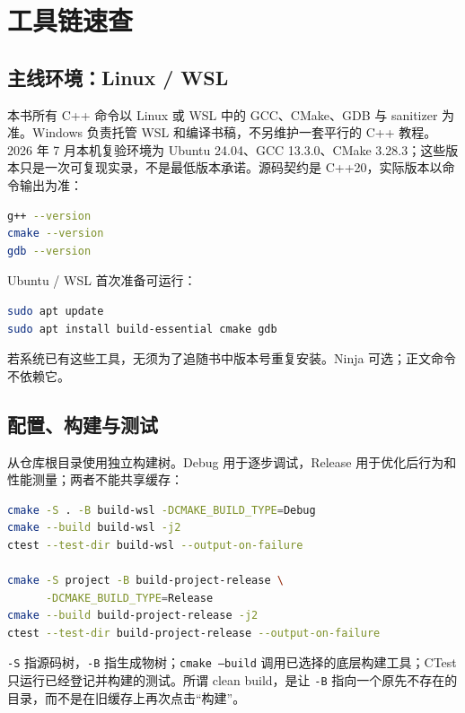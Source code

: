\chapter{工具链速查}

\section{主线环境：Linux / WSL}

本书所有 C++ 命令以 Linux 或 WSL 中的 GCC、CMake、GDB 与 sanitizer 为准。Windows 负责托管 WSL 和编译书稿，不另维护一套平行的 C++ 教程。2026 年 7 月本机复验环境为 Ubuntu 24.04、GCC 13.3.0、CMake 3.28.3；这些版本只是一次可复现实录，不是最低版本承诺。源码契约是 C++20，实际版本以命令输出为准：

\begin{lstlisting}[language=bash,numbers=none]
g++ --version
cmake --version
gdb --version
\end{lstlisting}

Ubuntu / WSL 首次准备可运行：

\begin{lstlisting}[language=bash,numbers=none]
sudo apt update
sudo apt install build-essential cmake gdb
\end{lstlisting}

若系统已有这些工具，无须为了追随书中版本号重复安装。Ninja 可选；正文命令不依赖它。

\section{配置、构建与测试}

从仓库根目录使用独立构建树。Debug 用于逐步调试，Release 用于优化后行为和性能测量；两者不能共享缓存：

\begin{lstlisting}[language=bash,numbers=none]
cmake -S . -B build-wsl -DCMAKE_BUILD_TYPE=Debug
cmake --build build-wsl -j2
ctest --test-dir build-wsl --output-on-failure

cmake -S project -B build-project-release \
      -DCMAKE_BUILD_TYPE=Release
cmake --build build-project-release -j2
ctest --test-dir build-project-release --output-on-failure
\end{lstlisting}

\texttt{-S} 指源码树，\texttt{-B} 指生成物树；\texttt{cmake --build} 调用已选择的底层构建工具；CTest 只运行已经登记并构建的测试。所谓 clean build，是让 \texttt{-B} 指向一个原先不存在的目录，而不是在旧缓存上再次点击“构建”。

